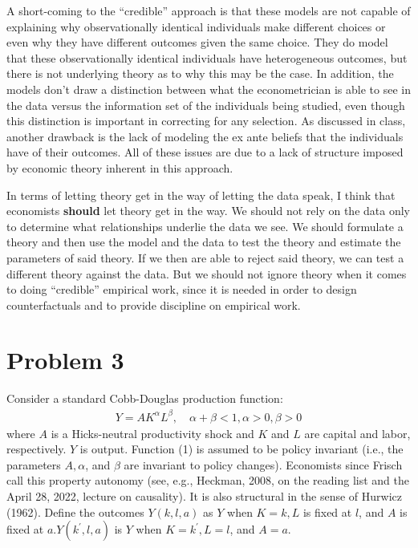 \documentclass{article}
\begin{document}
A short-coming to the ``credible'' approach is that these models are not capable of explaining why observationally identical individuals make different choices or even why they have different outcomes given the same choice. They do model that these observationally identical individuals have heterogeneous outcomes, but there is not underlying theory as to why this may be the case. In addition, the models don't draw a distinction between what the econometrician is able to see in the data versus the information set of the individuals being studied, even though this distinction is important in correcting for any selection. As discussed in class, another drawback is the lack of modeling the ex ante beliefs that the individuals have of their outcomes. All of these issues are due to a lack of structure imposed by economic theory inherent in this approach. 

In terms of letting theory get in the way of letting the data speak, I think that economists \textbf{should} let theory get in the way. We should not rely on the data only to determine what relationships underlie the data we see. We should formulate a theory and then use the model and the data to test the theory and estimate the parameters of said theory. If we then are able to reject said theory, we can test a different theory against the data. But we should not ignore theory when it comes to doing ``credible'' empirical work, since it is needed in order to design counterfactuals and to provide discipline on empirical work.

\newpage

\section*{Problem 3}
Consider a standard Cobb-Douglas production function:
\begin{align}\label{eq:eq1p3}
Y=A K^{\alpha} L^{\beta}, \quad \alpha+\beta<1, \alpha>0, \beta>0
\end{align}
where $A$ is a Hicks-neutral productivity shock and $K$ and $L$ are capital and labor, respectively. $Y$ is output. Function (1) is assumed to be policy invariant (i.e., the parameters $A, \alpha$, and $\beta$ are invariant to policy changes). Economists since Frisch call this property autonomy (see, e.g., Heckman, 2008, on the reading list and the April 28, 2022, lecture on causality). It is also structural in the sense of Hurwicz (1962). Define the outcomes $Y(k, l, a)$ as $Y$ when $K=k, L$ is fixed at $l$, and $A$ is fixed at $a . Y\left(k^{\prime}, l, a\right)$ is $Y$ when $K=k^{\prime}, L=l$, and $A=a$.
 
\end{document}
